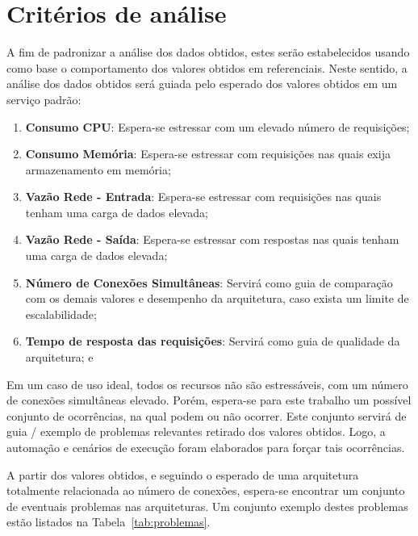 \section{Critérios de análise}
\label{sec:criterios}

A fim de padronizar a análise dos dados obtidos, estes serão estabelecidos usando como base o comportamento dos valores obtidos em referenciais.
%
Neste sentido, a análise dos dados obtidos será guiada pelo esperado dos valores obtidos em um serviço padrão:

\begin{enumerate}
  \item \textbf{Consumo CPU}: Espera-se estressar com um elevado número de requisições;
  \item \textbf{Consumo Memória}: Espera-se estressar com requisições nas quais exija armazenamento em memória;
  \item \textbf{Vazão Rede - Entrada}: Espera-se estressar com requisições nas quais tenham uma carga de dados elevada;
  \item \textbf{Vazão Rede - Saída}: Espera-se estressar com respostas nas quais tenham uma carga de dados elevada;
  \item \textbf{Número de Conexões Simultâneas}: Servirá como guia de comparação com os demais valores e desempenho da arquitetura, caso exista um limite de escalabilidade;
  \item \textbf{Tempo de resposta das requisições}: Servirá como guia de qualidade da arquitetura; e
\end{enumerate}

Em um caso de uso ideal, todos os recursos não são estressáveis, com um número de conexões simultâneas elevado.
%
Porém, espera-se para este trabalho um possível conjunto de ocorrências, na qual podem ou não ocorrer.
%
Este conjunto servirá de guia / exemplo de problemas relevantes retirado dos valores obtidos.
%
Logo, a automação e cenários de execução foram elaborados para forçar tais ocorrências.


A partir dos valores obtidos, e seguindo o esperado de uma arquitetura totalmente relacionada ao número de conexões, espera-se encontrar um conjunto de eventuais problemas nas arquiteturas.
%
Um conjunto exemplo destes problemas estão listados na Tabela~\ref{tab:problemas}.
\pagebreak


